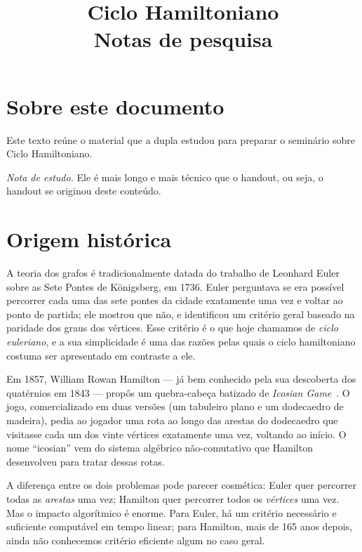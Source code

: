 \documentclass[11pt,a4paper]{article}
\title{\textbf{Ciclo Hamiltoniano}\\
       \large Notas de pesquisa}
\date{}
\theoremstyle{definition}
\newcommand{\nota}[1]{%
  \par\medskip
  {\small\color{notagray}\textit{Nota de estudo.} #1}\par\medskip
}
\begin{document}
\maketitle

\section*{Sobre este documento}

Este texto reúne o material que a dupla estudou para preparar o seminário sobre Ciclo Hamiltoniano. 
\nota{Ele é mais longo e mais técnico que o handout, ou seja, o handout se originou deste conteúdo.}

\tableofcontents

\section{Origem histórica}

A teoria dos grafos é tradicionalmente datada do trabalho de Leonhard Euler sobre as Sete Pontes de Königsberg, em 1736. Euler perguntava se era possível percorrer cada uma das sete pontes da cidade exatamente uma vez e voltar ao ponto de partida; ele mostrou que não, e identificou um critério geral baseado na paridade dos graus dos vértices. Esse critério é o que hoje chamamos de \emph{ciclo euleriano}, e a sua simplicidade é uma das razões pelas quais o ciclo hamiltoniano costuma ser apresentado em contraste a ele.

Em 1857, William Rowan Hamilton --- já bem conhecido pela sua descoberta dos quatérnios em 1843 --- propôs um quebra-cabeça batizado de \emph{Icosian Game}~\citep{hamilton1856}. O jogo, comercializado em duas versões (um tabuleiro plano e um dodecaedro de madeira), pedia ao jogador uma rota ao longo das arestas do dodecaedro que visitasse cada um dos vinte vértices exatamente uma vez, voltando ao início. O nome ``icosian'' vem do sistema algébrico não-comutativo que Hamilton desenvolveu para tratar dessas rotas.

A diferença entre os dois problemas pode parecer cosmética: Euler quer percorrer todas as \emph{arestas} uma vez; Hamilton quer percorrer todos os \emph{vértices} uma vez. Mas o impacto algorítmico é enorme. Para Euler, há um critério necessário e suficiente computável em tempo linear; para Hamilton, mais de 165 anos depois, ainda não conhecemos critério eficiente algum no caso geral.
\end{document}
